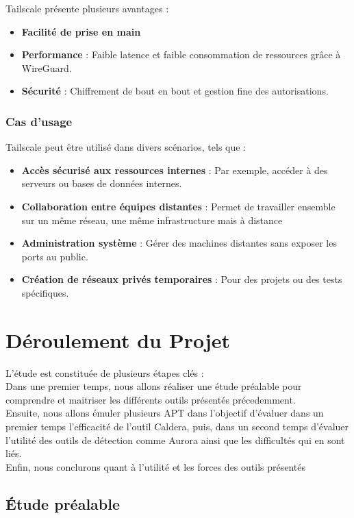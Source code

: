 \documentclass[12pt,letterpaper]{article}
\begin{document}
Tailscale présente plusieurs avantages :
\begin{itemize}
    \item \textbf{Facilité de prise en main}
    \item \textbf{Performance} : Faible latence et faible consommation de ressources grâce à WireGuard.
    \item \textbf{Sécurité} : Chiffrement de bout en bout et gestion fine des autorisations.
\end{itemize}

\subsubsection{Cas d'usage}

Tailscale peut être utilisé dans divers scénarios, tels que :
\begin{itemize}
    \item \textbf{Accès sécurisé aux ressources internes} : Par exemple, accéder à des serveurs ou bases de données internes.
    \item \textbf{Collaboration entre équipes distantes} : Permet de travailler ensemble sur un même réseau, une même infrastructure mais à distance
    \item \textbf{Administration système} : Gérer des machines distantes sans exposer les ports au public.
    \item \textbf{Création de réseaux privés temporaires} : Pour des projets ou des tests spécifiques.
\end{itemize}

\section{Déroulement du Projet}

L'étude est constituée de plusieurs étapes clés : \\
Dans une premier temps, nous allons réaliser une étude préalable pour comprendre et maitriser les différents outils présentés précedemment. \\
Ensuite, nous allons émuler plusieurs APT dans l'objectif d'évaluer dans un premier temps l'efficacité de l'outil Caldera, puis, dans un second temps d'évaluer l'utilité des outils de détection comme Aurora ainsi que les difficultés qui en sont liés. \\
Enfin, nous conclurons quant à l'utilité et les forces des outils présentés 

\subsection{Étude préalable}
\end{document}
